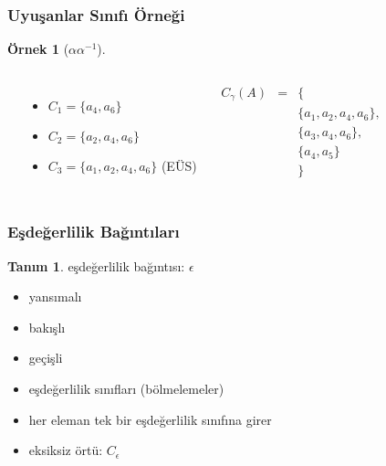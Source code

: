 \documentclass[dvipsnames]{beamer}
\theoremstyle{definition}
\newtheorem{tanim}[theorem]{Tanım}
\theoremstyle{example}
\newtheorem{ornek}[theorem]{Örnek}
\theoremstyle{plain}
\begin{document}
\begin{frame}
  \frametitle{Uyuşanlar Sınıfı Örneği}

  \begin{ornek}[$\alpha \alpha^{-1}$]
    \begin{columns}
      \begin{center}
      \end{center}

      \pause
      \begin{itemize}
        \item $C_1=\{a_4,a_6\}$
        \item $C_2=\{a_2,a_4,a_6\}$
        \item $C_3=\{a_1,a_2,a_4,a_6\}$ (EÜS)
      \end{itemize}

      \pause
      \medskip
      \begin{eqnarray*}
        C_\gamma (A) & = & \{\\
                      &   & \{a_1,a_2,a_4,a_6\},\\
                      &   & \{a_3,a_4,a_6\},\\
                      &   & \{a_4,a_5\}\\
                      &   & \}
      \end{eqnarray*}
    \end{columns}
  \end{ornek}
\end{frame}

\begin{frame}
  \frametitle{Eşdeğerlilik Bağıntıları}

  \begin{tanim}
    \alert{eşdeğerlilik bağıntısı}: $\epsilon$
    \begin{itemize}
      \item yansımalı
      \item bakışlı
      \item geçişli
    \end{itemize}
  \end{tanim}

  \pause
  \begin{itemize}
    \item \alert{eşdeğerlilik sınıfları (bölmelemeler)}
    \item her eleman tek bir eşdeğerlilik sınıfına girer

    \medskip
    \item eksiksiz örtü: $C_\epsilon$
  \end{itemize}
\end{frame}
\end{document}
